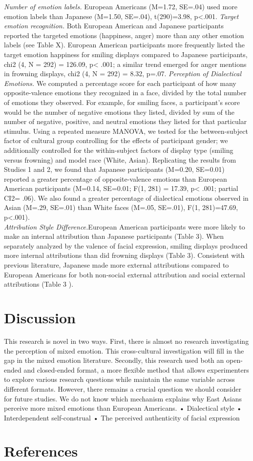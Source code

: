 \documentclass[english,man]{apa6}
\begin{document}
\emph{Number of emotion labels.} European Americans (M=1.72, SE=.04)
used more emotion labels than Japanese (M=1.50, SE=.04), t(290)=3.98,
p\textless{}.001. \emph{Target emotion recognition.} Both European
American and Japanese participants reported the targeted emotions
(happiness, anger) more than any other emotion labels (see Table X).
European American participants more frequently listed the target emotion
happiness for smiling displays compared to Japanese participants, chi2
(4, N = 292) = 126.09, p\textless{} .001; a similar trend emerged for
anger mentions in frowning displays, chi2 (4, N = 292) = 8.32, p=.07.
\emph{Perception of Dialectical Emotions.} We computed a percentage
score for each participant of how many opposite-valence emotions they
recognized in a face, divided by the total number of emotions they
observed. For example, for smiling faces, a participant's score would be
the number of negative emotions they listed, divided by sum of the
number of negative, positive, and neutral emotions they listed for that
particular stimulus. Using a repeated measure MANOVA, we tested for the
between-subject factor of cultural group controlling for the effects of
participant gender; we additionally controlled for the within-subject
factors of display type (smiling versus frowning) and model race (White,
Asian). Replicating the results from Studies 1 and 2, we found that
Japanese participants (M=0.20, SE=0.01) reported a greater percentage of
opposite-valence emotions than European American participants (M=0.14,
SE=0.01; F(1, 281) = 17.39, p\textless{} .001; partial CI2= .06). We
also found a greater percentage of dialectical emotions observed in
Asian (M=.29, SE=.01) than White faces (M=.05, SE=.01), F(1, 281)=47.69,
p\textless{}.001).\\\emph{Attribution Style Difference.}European
American participants were more likely to make an internal attribution
than Japanese participants (Table 3). When separately analyzed by the
valence of facial expression, smiling displays produced more internal
attributions than did frowning displays (Table 3). Consistent with
previous literature, Japanese made more external attributions compared
to European Americans for both non-social external attribution and
social external attributions (Table 3 ).

\section{Discussion}\label{discussion}

This research is novel in two ways. First, there is almost no research
investigating the perception of mixed emotion. This cross-cultural
investigation will fill in the gap in the mixed emotion literature.
Secondly, this research used both an open-ended and closed-ended format,
a more flexible method that allows experimenters to explore various
research questions while maintain the same variable across different
formats. However, there remains a crucial question we should consider
for future studies. We do not know which mechanism explains why East
Asians perceive more mixed emotions than European Americans. •
Dialectical style • Interdependent self-construal • The perceived
authenticity of facial expression

\section{References}\label{references}

\setlength{\parindent}{-0.5in} \setlength{\leftskip}{0.5in}
\setlength{\parskip}{8pt}
\end{document}
